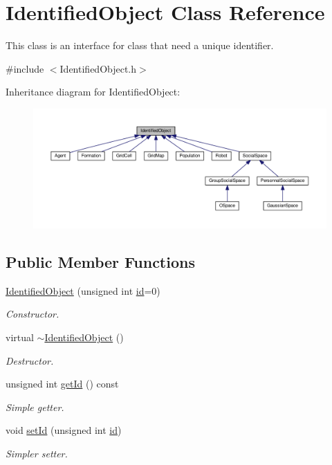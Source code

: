 \hypertarget{classIdentifiedObject}{}\section{Identified\+Object Class Reference}
\label{classIdentifiedObject}


This class is an interface for class that need a unique identifier.  




{\ttfamily \#include $<$Identified\+Object.\+h$>$}



Inheritance diagram for Identified\+Object\+:\nopagebreak
\begin{figure}[H]
\begin{center}
\leavevmode
\includegraphics[width=350pt]{classIdentifiedObject__inherit__graph}
\end{center}
\end{figure}
\subsection*{Public Member Functions}
\begin{DoxyCompactItemize}
\item 
\hyperlink{classIdentifiedObject_ab2b3eaf77f6ff94f619478d0f20dd5c1}{Identified\+Object} (unsigned int \hyperlink{classIdentifiedObject_ad044a317a9b573a3d1bcd025df166eb5}{id}=0)
\begin{DoxyCompactList}\small\item\em Constructor. \end{DoxyCompactList}\item 
virtual \hyperlink{classIdentifiedObject_af240a574a25906024375725985ef46b4}{$\sim$\+Identified\+Object} ()
\begin{DoxyCompactList}\small\item\em Destructor. \end{DoxyCompactList}\item 
unsigned int \hyperlink{classIdentifiedObject_a1fdb1d89faff5712c9016c4fdd55bf47}{get\+Id} () const 
\begin{DoxyCompactList}\small\item\em Simple getter. \end{DoxyCompactList}\item 
void \hyperlink{classIdentifiedObject_a48cbaa2561de7a401bf01a0541c596ff}{set\+Id} (unsigned int \hyperlink{classIdentifiedObject_ad044a317a9b573a3d1bcd025df166eb5}{id})
\begin{DoxyCompactList}\small\item\em Simpler setter. \end{DoxyCompactList}\end{DoxyCompactItemize}
